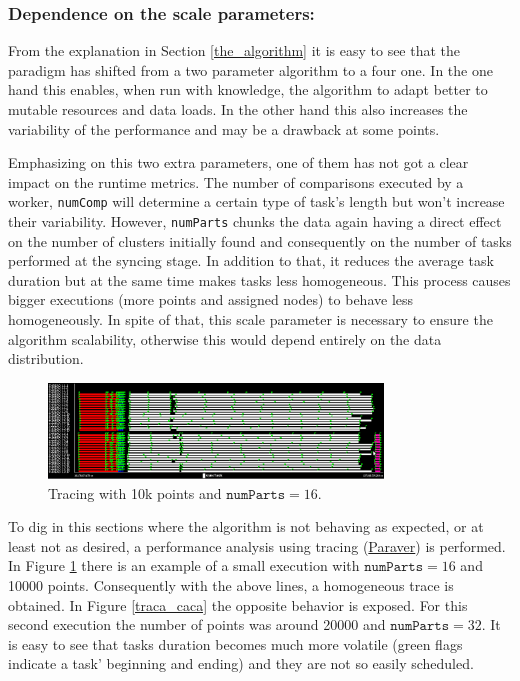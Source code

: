 \documentclass[10pt,journal,compsoc]{IEEEtran}
\let\MYoriglatexcaption\caption
\renewcommand{\caption}[2][\relax]{\MYoriglatexcaption[#2]{#2}}
\begin{document}
\subsubsection*{Dependence on the scale parameters:}

From the explanation in Section \ref{the_algorithm} it is easy to see that the paradigm has shifted from a two parameter algorithm to a four one. In the one hand this enables, when run with knowledge, the algorithm to adapt better to mutable resources and data loads. In the other hand this also increases the variability of the performance and may be a drawback at some points.

Emphasizing on this two extra parameters, one of them has not got a clear impact on the runtime metrics. The number of comparisons executed by a worker, \texttt{numComp} will determine a certain type of task's length but won't increase their variability. However, \texttt{numParts} chunks the data again having a direct effect on the number of clusters initially found and consequently on the number of tasks performed at the syncing stage. In addition to that, it reduces the average task duration but at the same time makes tasks less homogeneous. This process causes bigger executions (more points and assigned nodes) to behave less homogeneously. In spite of that, this scale parameter is necessary to ensure the algorithm scalability, otherwise this would depend entirely on the data distribution.

\begin{figure}[!h]
\centering
\includegraphics[width=3.5in]{img/traca_compacte.png}
\caption{Tracing with 10k points and $\texttt{numParts}=16$.}
\label{traca_bona}
\end{figure}

To dig in this sections where the algorithm is not behaving as expected, or at least not as desired, a performance analysis using tracing (\href{https://tools.bsc.es/paraver}{Paraver}) is performed. In Figure \ref{traca_bona} there is an example of a small execution with  $\texttt{numParts}=16$ and 10000 points. Consequently with the above lines, a homogeneous trace is obtained. In Figure \ref{traca_caca} the opposite behavior is exposed. For this second execution the number of points was around 20000 and $\texttt{numParts}=32$. It is easy to see that tasks duration becomes much more volatile (green flags indicate a task' beginning and ending) and they are not so easily scheduled.
\end{document}
